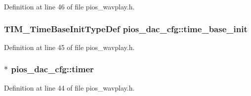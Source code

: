 Definition at line 46 of file pios\-\_\-wavplay.\-h.

\hypertarget{group___p_i_o_s___w_a_v_p_l_a_y_ga1568b0926bb1e178d06682a8495e0f40}{
\subsubsection[{time\-\_\-base\-\_\-init}]{\setlength{\rightskip}{0pt plus 5cm}T\-I\-M\-\_\-\-Time\-Base\-Init\-Type\-Def pios\-\_\-dac\-\_\-cfg\-::time\-\_\-base\-\_\-init}}\label{group___p_i_o_s___w_a_v_p_l_a_y_ga1568b0926bb1e178d06682a8495e0f40}


Definition at line 45 of file pios\-\_\-wavplay.\-h.

\hypertarget{group___p_i_o_s___w_a_v_p_l_a_y_ga06b2a838489fd6bb8f48615002e024d8}{
\subsubsection[{timer}]{$\ast$ pios\-\_\-dac\-\_\-cfg\-::timer}}\label{group___p_i_o_s___w_a_v_p_l_a_y_ga06b2a838489fd6bb8f48615002e024d8}


Definition at line 44 of file pios\-\_\-wavplay.\-h.

